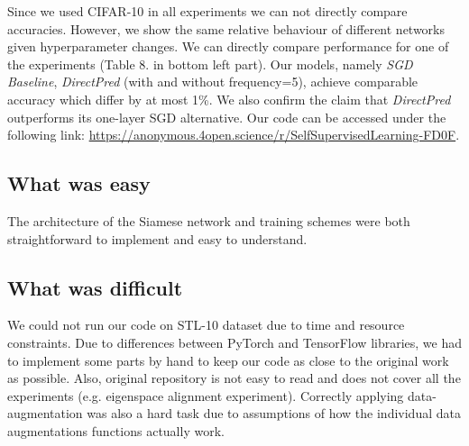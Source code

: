 Since we used CIFAR-10 in all experiments we can not directly compare accuracies. However, we show the same relative behaviour of different networks given hyperparameter changes. We can directly compare performance for one of the experiments (Table 8. in \cite{tian2021understanding} bottom left part). Our models, namely \emph{SGD Baseline}, \emph{DirectPred} (with and without frequency=5), achieve comparable accuracy which differ by at most 1\%. We also confirm the claim that \emph{DirectPred} outperforms its one-layer SGD alternative. Our code can be accessed under the following link: \url{https://anonymous.4open.science/r/SelfSupervisedLearning-FD0F}. 

\subsection*{What was easy}


The architecture of the Siamese network and training schemes were both straightforward to implement and easy to understand. 

\subsection*{What was difficult}


 
We could not run our code on STL-10 dataset due to time and resource constraints.
Due to differences between PyTorch and TensorFlow libraries, we had to implement some parts by hand to keep our code as close to the original work as possible. Also, original repository is not easy to read and does not cover all the experiments (e.g. eigenspace alignment experiment). Correctly applying data-augmentation was also a hard task due to assumptions of how the individual data augmentations functions actually work.

